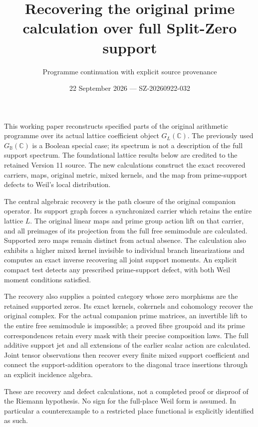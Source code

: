 \documentclass[11pt]{article}
\title{Recovering the original prime calculation over full Split-Zero support}
\author{Programme continuation with explicit source provenance}
\date{22 September 2026 --- SZ-20260922-032}
\begin{document}
\maketitle

This working paper reconstructs specified parts of the original
arithmetic programme over its actual lattice coefficient object
$G_L(\mathbb C)$. The previously used $G_{\mathbb B}(\mathbb C)$ is a
Boolean special case; its spectrum is not a description of the full
support spectrum. The foundational lattice results below are credited
to the retained Version 11 source. The new calculations construct
the exact recovered carriers, maps, original metric, mixed kernels,
and the map from prime-support defects to Weil's local distribution.

The central algebraic recovery is the path closure of the original
companion operator. Its support graph forces a synchronized carrier
which retains the entire lattice $L$. The original linear maps and
prime group action lift on that carrier, and all preimages of its
projection from the full free semimodule are calculated. Supported
zero maps remain distinct from actual absence. The calculation also
exhibits a higher mixed kernel invisible to individual branch
linearizations and computes an exact inverse recovering all joint
support moments. An explicit compact test detects any prescribed
prime-support defect, with both Weil moment conditions satisfied.

The recovery also supplies a pointed category whose zero morphisms
are the retained supported zeros. Its exact kernels, cokernels and
cohomology recover the original complex. For the actual companion
prime matrices, an invertible lift to the entire free semimodule is
impossible; a proved fibre groupoid and its prime correspondences
retain every mask with their precise composition laws. The full
additive support jet and all extensions of the earlier scalar action
are calculated. Joint tensor observations then recover every finite
mixed support coefficient and connect the support-addition operators
to the diagonal trace insertions through an explicit incidence algebra.

These are recovery and defect calculations, not a completed proof or
disproof of the Riemann hypothesis. No sign for the full-place Weil
form is assumed. In particular a counterexample to a restricted
place functional is explicitly identified as such.
\end{document}
